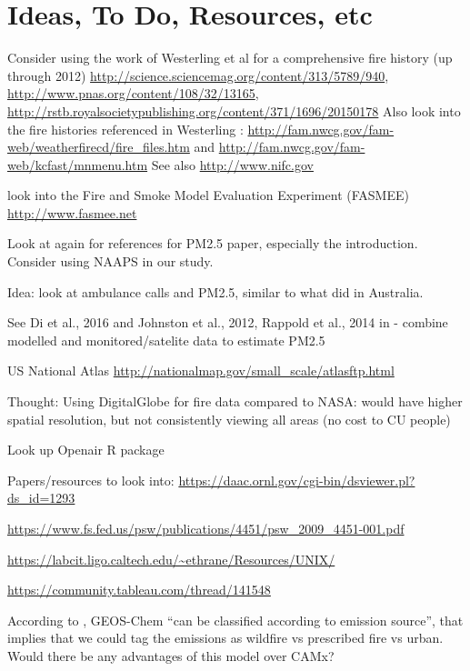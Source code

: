\section{Ideas, To Do, Resources, etc}

Consider using the work of Westerling et al for a comprehensive fire history (up through 2012) \url{http://science.sciencemag.org/content/313/5789/940}, \url{http://www.pnas.org/content/108/32/13165}, \url{http://rstb.royalsocietypublishing.org/content/371/1696/20150178} \cite{westerling_increasing_2016,WesterlingCorrection2016} Also look into the fire histories referenced in Westerling \cite{westerling_increasing_2016,WesterlingCorrection2016}: \url{http://fam.nwcg.gov/fam-web/weatherfirecd/fire_files.htm} and \url{http://fam.nwcg.gov/fam-web/kcfast/mnmenu.htm} See also \url{http://www.nifc.gov}

look into the Fire and Smoke Model Evaluation Experiment (FASMEE) \url{http://www.fasmee.net}

Look at \cite{kollanus_effects_2016} again for references for PM2.5 paper, especially the introduction. Consider using NAAPS in our study. 

Idea: look at ambulance calls and PM2.5, similar to what \cite{salimi_ambient_2016} did in Australia.

See Di et al., 2016 and Johnston et al., 2012, Rappold et al., 2014 in \cite{jones_application_2017} - combine modelled and monitored/satelite data to estimate PM2.5

US National Atlas \url{http://nationalmap.gov/small_scale/atlasftp.html}

Thought: Using DigitalGlobe for fire data compared to NASA: would have higher spatial resolution, but not consistently viewing all areas (no cost to CU people) 

Look up Openair R package

Papers/resources to look into: \url{https://daac.ornl.gov/cgi-bin/dsviewer.pl?ds_id=1293}

\url{https://www.fs.fed.us/psw/publications/4451/psw_2009_4451-001.pdf}

\url{https://labcit.ligo.caltech.edu/~ethrane/Resources/UNIX/}

\url{https://community.tableau.com/thread/141548}

According to \cite{liu_particulate_2016}, GEOS-Chem ``can be classified according to emission source'', that implies that we could tag the emissions as wildfire vs prescribed fire vs urban. Would there be any advantages of this model over CAMx?

